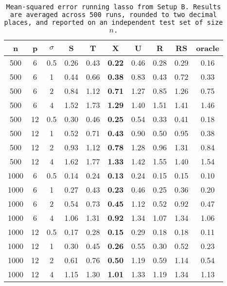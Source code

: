 \begin{table}[ht]
\centering
\begin{tabular}{cccccccccc}
  \hline
n & p & $\sigma$ & S & T & X & U & R & RS & oracle \\ 
  \hline
500 & 6 & 0.5 & 0.26 & 0.43 & \bf 0.22 & 0.46 & 0.28 & 0.29 & 0.16 \\ 
  500 & 6 & 1 & 0.44 & 0.66 & \bf 0.38 & 0.83 & 0.43 & 0.72 & 0.33 \\ 
  500 & 6 & 2 & 0.84 & 1.12 & \bf 0.71 & 1.27 & 0.85 & 1.26 & 0.75 \\ 
  500 & 6 & 4 & 1.52 & 1.73 & \bf 1.29 & 1.40 & 1.51 & 1.41 & 1.46 \\ 
  500 & 12 & 0.5 & 0.30 & 0.46 & \bf 0.25 & 0.54 & 0.33 & 0.41 & 0.18 \\ 
  500 & 12 & 1 & 0.52 & 0.71 & \bf 0.43 & 0.90 & 0.50 & 0.95 & 0.38 \\ 
  500 & 12 & 2 & 0.93 & 1.12 & \bf 0.78 & 1.28 & 0.96 & 1.31 & 0.84 \\ 
  500 & 12 & 4 & 1.62 & 1.77 & \bf 1.33 & 1.42 & 1.55 & 1.40 & 1.54 \\ 
  1000 & 6 & 0.5 & 0.14 & 0.24 & \bf 0.13 & 0.24 & 0.15 & 0.15 & 0.10 \\ 
  1000 & 6 & 1 & 0.27 & 0.43 & \bf 0.23 & 0.46 & 0.25 & 0.36 & 0.20 \\ 
  1000 & 6 & 2 & 0.54 & 0.73 & \bf 0.45 & 1.12 & 0.52 & 0.92 & 0.47 \\ 
  1000 & 6 & 4 & 1.06 & 1.31 & \bf 0.92 & 1.34 & 1.07 & 1.34 & 1.06 \\ 
  1000 & 12 & 0.5 & 0.17 & 0.28 & \bf 0.15 & 0.29 & 0.18 & 0.18 & 0.11 \\ 
  1000 & 12 & 1 & 0.30 & 0.45 & \bf 0.26 & 0.55 & 0.30 & 0.52 & 0.23 \\ 
  1000 & 12 & 2 & 0.61 & 0.76 & \bf 0.50 & 1.19 & 0.59 & 1.14 & 0.54 \\ 
  1000 & 12 & 4 & 1.15 & 1.30 & \bf 1.01 & 1.33 & 1.19 & 1.34 & 1.13 \\ 
   \hline
\end{tabular}
\caption{\tt Mean-squared error running \texttt{lasso} from Setup B. Results are averaged across 500 runs, rounded to two decimal places, and reported on an independent test set of size $n$.} 
\label{table:setup2}
\end{table}
